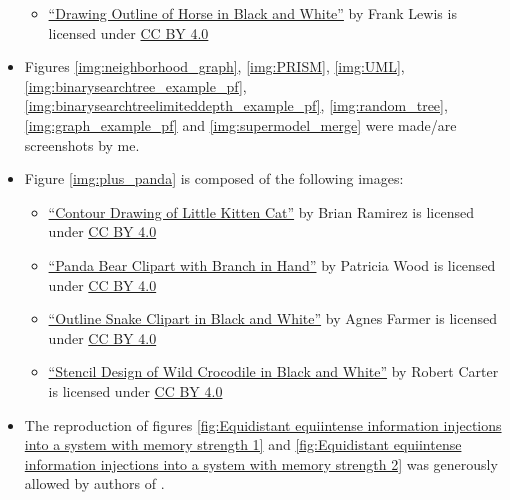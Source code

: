 \documentclass[hidelinks]{scrartcl}
\begin{document}
\begin{itemize}
\begin{itemize}
	\item \href{http://animalsclipart.com/drawing-outline-of-horse-in-black-and-white/}{``Drawing Outline of Horse in Black and White''} by Frank Lewis is licensed under \href{https://creativecommons.org/licenses/by/4.0/}{CC BY 4.0}
	\end{itemize}
\item Figures \ref{img:neighborhood_graph}, \ref{img:PRISM}, \ref{img:UML}, \ref{img:binarysearchtree_example_pf}, \ref{img:binarysearchtreelimiteddepth_example_pf}, \ref{img:random_tree}, \ref{img:graph_example_pf} and \ref{img:supermodel_merge} were made/are screenshots by me.
\item Figure \ref{img:plus_panda} is composed of the following images:
	\begin{itemize}
	\item \href{http://animalsclipart.com/contour-drawing-of-little-kitten-cat/}{``Contour Drawing of Little Kitten Cat''} by Brian Ramirez is licensed under \href{https://creativecommons.org/licenses/by/4.0/}{CC BY 4.0}
	\item \href{http://animalsclipart.com/panda-bear-clipart-with-branch-in-hand/}{``Panda Bear Clipart with Branch in Hand''} by Patricia Wood is licensed under \href{https://creativecommons.org/licenses/by/4.0/}{CC BY 4.0}
	\item \href{http://animalsclipart.com/outline-snake-clipart-in-black-and-white/}{``Outline Snake Clipart in Black and White''} by Agnes Farmer is licensed under \href{https://creativecommons.org/licenses/by/4.0/}{CC BY 4.0}
	\item \href{http://animalsclipart.com/stencil-design-of-wild-crocodile-in-black-and-white/}{``Stencil Design of Wild Crocodile in Black and White''} by Robert Carter is licensed under \href{https://creativecommons.org/licenses/by/4.0/}{CC BY 4.0}
	\end{itemize}
\item The reproduction of figures \ref{fig:Equidistant equiintense information injections into a system with memory strength 1} and \ref{fig:Equidistant equiintense information injections into a system with memory strength 2} was generously allowed by authors of \cite{Yffelti.2016}.
\end{itemize}


\end{document}

